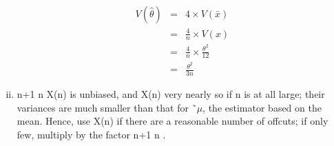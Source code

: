 \documentclass[a4paper,12pt]{article}
\begin{document}
\begin{enumerate}[(i)]
\begin{eqnarray*}
V(\hat{\theta}) &=& 4 \times V(\bar{x})\\
 &=& \frac{4}{n} \times V(x) \\
 &=& \frac{4}{n} \times \frac{\theta^2}{12} \\
 &=& \frac{\theta^2}{3n}
\end{eqnarray*}

\item n+1
n X(n) is unbiased, and X(n) very nearly so if n is at all large; their
variances are much smaller than that for ˜$\mu$, the estimator based on the mean.
Hence, use X(n) if there are a reasonable number of offcuts; if only few,
multiply by the factor n+1
n .
\end{enumerate}
\end{document}

